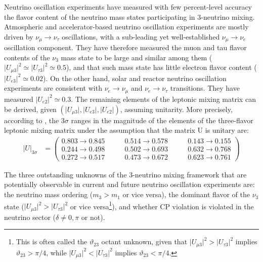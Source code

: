 Neutrino oscillation experiments have measured with few percent-level accuracy the flavor content of the neutrino mass states participating in 3-neutrino mixing. Atmospheric and accelerator-based neutrino oscillation experiments are mostly driven by $\nu_{\mu}\to\nu_{\tau}$ oscillations, with a sub-leading yet well-established $\nu_{\mu}\to\nu_{e}$ oscillation component.  They have therefore measured the muon and tau flavor contents of the $\nu_3$ mass state to be large and similar among them ($\lvert U_{\mu 3}\rvert^2\simeq \lvert U_{\tau 3}\rvert^2\simeq 0.5$), and that such mass state has little electron flavor content ($\lvert U_{e3}\rvert^2\simeq 0.02$). On the other hand, solar and reactor neutrino oscillation experiments are consistent with $\nu_e\to\nu_{\mu}$ and $\nu_e\to\nu_{\tau}$ transitions. They have measured $\lvert U_{e2}\rvert^2\simeq 0.3$. The remaining elements of the leptonic mixing matrix can  be derived, given $(\lvert U_{\mu 3}\rvert,\lvert U_{e3}\rvert,\lvert U_{e2}\rvert)$, assuming unitarity. More precisely, according to \cite{Esteban:2020cvm}, the 3$\sigma$ ranges in the magnitude of the elements of the three-flavor leptonic mixing matrix under the assumption that the matrix U is unitary are:
\begin{equation}
  \label{eq:umatrix}
  \begin{aligned}
    \lvert U\rvert_{3\sigma} &=
    \begin{pmatrix}
      0.803 \to 0.845 &\qquad
      0.514 \to 0.578 &\qquad
      0.143 \to 0.155
      \\
      0.244 \to 0.498 &\qquad
      0.502 \to 0.693 &\qquad
      0.632 \to 0.768
      \\
      0.272 \to 0.517 &\qquad
      0.473 \to 0.672 &\qquad
      0.623 \to 0.761
    \end{pmatrix}
  \end{aligned}
\end{equation}
%

The three outstanding unknowns of the 3-neutrino mixing framework that are potentially observable in current and future neutrino oscillation experiments are: the neutrino mass ordering ($m_3>m_1$ or vice versa), the dominant flavor of the $\nu_3$ state ($\lvert U_{\mu 3}\rvert^2 > \lvert U_{\tau 3}\rvert^2$ or vice versa\footnote{This is often called the $\vartheta_{23}$ octant unknown, given that $\lvert U_{\mu 3}\rvert^2 > \lvert U_{\tau 3}\rvert^2$ implies $\vartheta_{23}>\pi/4$, while $\lvert U_{\mu 3}\rvert^2 < \lvert U_{\tau 3}\rvert^2$ implies $\vartheta_{23}<\pi/4$.}), and whether CP violation is violated in the neutrino sector ($\delta\neq 0,\pi$ or not).


